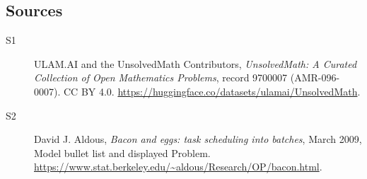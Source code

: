 \documentclass[11pt]{article}
\begin{document}
\subsection{Sources}
\begin{description}
\item[\hypertarget{source:9700007:1}{S1}] ULAM.AI and the UnsolvedMath Contributors, \emph{UnsolvedMath: A Curated Collection of Open Mathematics Problems}, record 9700007 (AMR-096-0007). CC BY 4.0. \url{https://huggingface.co/datasets/ulamai/UnsolvedMath}.
\item[\hypertarget{source:9700007:2}{S2}] David J. Aldous, \emph{Bacon and eggs: task scheduling into batches}, March 2009, Model bullet list and displayed Problem. \url{https://www.stat.berkeley.edu/~aldous/Research/OP/bacon.html}.
\end{description}
\label{end:9700007}
\end{document}
